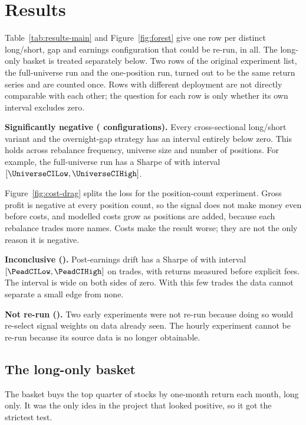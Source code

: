 \section{Results}\label{sec:results}
Table~\ref{tab:results-main} and Figure~\ref{fig:forest} give one row per distinct long/short, gap and earnings configuration that could be re-run, \NumRerunConfigs{} in all. The long-only basket is treated separately below. Two rows of the original experiment list, the full-universe run and the one-position run, turned out to be the same return series and are counted once. Rows with different deployment are not directly comparable with each other; the question for each row is only whether its own interval excludes zero.




\textbf{Significantly negative (\NumSigNegConfigs{} configurations).} Every cross-sectional long/short variant and the overnight-gap strategy has an interval entirely below zero. This holds across rebalance frequency, universe size and number of positions. For example, the full-universe run has a Sharpe of \UniverseSharpe{} with interval $[\UniverseCILow, \UniverseCIHigh]$.

Figure~\ref{fig:cost-drag} splits the loss for the position-count experiment. Gross profit is negative at every position count, so the signal does not make money even before costs, and modelled costs grow as positions are added, because each rebalance trades more names. Costs make the result worse; they are not the only reason it is negative.



\textbf{Inconclusive (\NumInconclusiveConfigs{}).} Post-earnings drift has a Sharpe of \PeadSharpe{} with interval $[\PeadCILow, \PeadCIHigh]$ on \PeadEvents{} trades, with returns measured before explicit fees. The interval is wide on both sides of zero. With this few trades the data cannot separate a small edge from none.

\textbf{Not re-run (\NumNotRerun{}).} Two early experiments were not re-run because doing so would re-select signal weights on data already seen. The hourly experiment cannot be re-run because its source data is no longer obtainable.

\subsection{The long-only basket}
The basket buys the top quarter of stocks by one-month return each month, long only. It was the only idea in the project that looked positive, so it got the strictest test.

